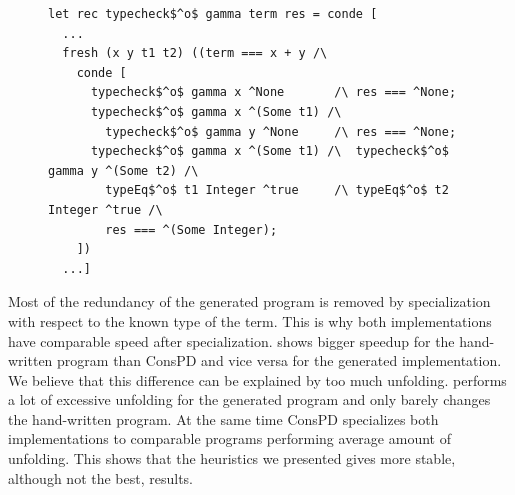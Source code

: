 \begin{figure}[!t]
  \centering
    \begin{lstlisting}[label={type:gen}, caption={A fragment of generated typechecker}, captionpos=b, frame=tb]
let rec typecheck$^o$ gamma term res = conde [
  ...
  fresh (x y t1 t2) ((term === x + y /\
    conde [
      typecheck$^o$ gamma x ^None       /\ res === ^None;
      typecheck$^o$ gamma x ^(Some t1) /\
        typecheck$^o$ gamma y ^None     /\ res === ^None;
      typecheck$^o$ gamma x ^(Some t1) /\  typecheck$^o$ gamma y ^(Some t2) /\
        typeEq$^o$ t1 Integer ^true     /\ typeEq$^o$ t2 Integer ^true /\
        res === ^(Some Integer);
    ])
  ...]
    \end{lstlisting}
\end{figure}

Most of the redundancy of the generated program is removed by specialization with respect to the known type of the term.
This is why both implementations have comparable speed after specialization.
\ecce shows bigger speedup for the hand-written program than ConsPD and vice versa for the generated implementation.
We believe that this difference can be explained by too much unfolding.
\ecce performs a lot of excessive unfolding for the generated program and only barely changes the hand-written program.
At the same time ConsPD specializes both implementations to comparable programs performing average amount of unfolding.
This shows that the heuristics we presented gives more stable, although not the best, results.
